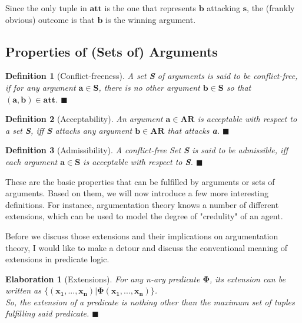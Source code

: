 \documentclass[12pt]{report}
\numberwithin{figure}{chapter}
\theoremstyle{break}
\newtheorem{defn}{Definition}[chapter]
\newtheorem{elab}{Elaboration}[chapter]
\newenvironment{mydefn}{\begin{defn}}{$\blacksquare$ \end{defn}}
\newenvironment{myelab}{\begin{elab}}{$\blacksquare$ \end{elab}}
\begin{document}
Since the only tuple in $\bm{att}$ is the one that represents $\bm{b}$ attacking $\bm{s}$, the (frankly obvious) outcome is that $\bm{b}$ is the winning argument.

\subsection{Properties of (Sets of) Arguments}

\begin{mydefn}[Conflict-freeness]
A set \textbf{S} of arguments is said to be conflict-free, if for any argument $\bm{a \in S}$, there is no other argument $\bm{b \in S}$ so that $\bm{(a,b) \in att}$.
\end{mydefn}

\begin{mydefn}[Acceptability]
An argument $\bm{a \in AR}$ is acceptable with respect to a set \textbf{S}, iff \textbf{S} attacks any argument $\bm{b \in AR}$ that attacks \textbf{a}. 
\end{mydefn}

\begin{mydefn}[Admissibility]
A conflict-free Set \textbf{S} is said to be admissible, iff each argument $\bm{a \in S}$ is acceptable with respect to \textbf{S}.
\end{mydefn}

These are the basic properties that can be fulfilled by arguments or sets of arguments. Based on them, we will now introduce a few more interesting definitions.
For instance, argumentation theory knows a number of different extensions, which can be used to model the degree of "credulity" of an agent.

Before we discuss those extensions and their implications on argumentation theory, I would like to make a detour and discuss the conventional meaning of extensions in predicate logic.

\begin{myelab}[Extensions]
For any n-ary predicate $\bm{\Phi}$, its extension can be written as $\bm{\{(x_{1},...,x_{n})|\Phi(x_{1},...,x_{n})\}}$.\\
So, the extension of a predicate is nothing other than the maximum set of tuples \\ fulfilling said predicate.
\end{myelab}

\newpage
\end{document}
